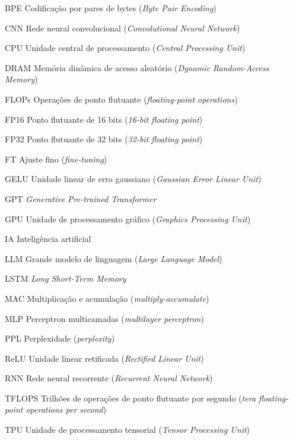 \begin{siglas}
    \item[BPE] Codificação por pares de bytes (\textit{Byte Pair Encoding})
    \item[CNN] Rede neural convolucional (\textit{Convolutional Neural Network})
    \item[CPU] Unidade central de processamento (\textit{Central Processing Unit})
    \item[DRAM] Memória dinâmica de acesso aleatório (\textit{Dynamic Random-Access Memory})
    \item[FLOPs] Operações de ponto flutuante (\textit{floating-point operations})
    \item[FP16] Ponto flutuante de 16 bits (\textit{16-bit floating point})
    \item[FP32] Ponto flutuante de 32 bits (\textit{32-bit floating point})
    \item[FT] Ajuste fino (\textit{fine-tuning})
    \item[GELU] Unidade linear de erro gaussiano (\textit{Gaussian Error Linear Unit})
    \item[GPT] \textit{Generative Pre-trained Transformer}
    \item[GPU] Unidade de processamento gráfico (\textit{Graphics Processing Unit})
    \item[IA] Inteligência artificial
    \item[LLM] Grande modelo de linguagem (\textit{Large Language Model})
    \item[LSTM] \textit{Long Short-Term Memory}
    \item[MAC] Multiplicação e acumulação (\textit{multiply-accumulate})
    \item[MLP] Perceptron multicamadas (\textit{multilayer perceptron})
    \item[PPL] Perplexidade (\textit{perplexity})
    \item[ReLU] Unidade linear retificada (\textit{Rectified Linear Unit})
    \item[RNN] Rede neural recorrente (\textit{Recurrent Neural Network})
    \item[TFLOPS] Trilhões de operações de ponto flutuante por segundo (\textit{tera floating-point operations per second})
    \item[TPU] Unidade de processamento tensorial (\textit{Tensor Processing Unit})
 \end{siglas}

